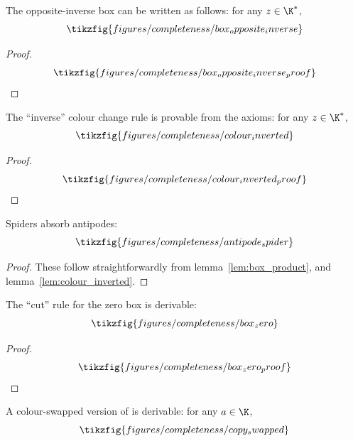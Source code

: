 \begin{lemma}
  \label{lem:box_opposite_inverse}
  The opposite-inverse box can be written as follows: for any \(z \in \K^*\),
  \begin{equation*}
    \tikzfig{figures/completeness/box_opposite_inverse}
  \end{equation*}
\end{lemma}
\begin{proof}
  \begin{equation}
    \tikzfig{figures/completeness/box_opposite_inverse_proof}
  \end{equation}
\end{proof}
\begin{lemma}
  \label{lem:colour_inverted}
  The ``inverse'' colour change rule is provable from the axioms: for any
  \(z \in \K^*\),
  \begin{equation*}
    \tikzfig{figures/completeness/colour_inverted}
  \end{equation*}
\end{lemma}
\begin{proof}
  \begin{equation}
    \tikzfig{figures/completeness/colour_inverted_proof}
  \end{equation}
\end{proof}
\begin{lemma}
  \label{lem:antipode_spider}
  Spiders absorb antipodes:
  \begin{equation*}
    \tikzfig{figures/completeness/antipode_spider}
  \end{equation*}
\end{lemma}
\begin{proof}
  These follow straightforwardly from lemma~\ref{lem:box_product}, \TextColour
  and lemma~\ref{lem:colour_inverted}.
\end{proof}
\begin{lemma}
  \label{lem:box_zero}
  The ``cut'' rule for the zero box is derivable:
  \begin{equation*}
    \tikzfig{figures/completeness/box_zero}
  \end{equation*}
\end{lemma}
\begin{proof}
  \begin{equation}
    \tikzfig{figures/completeness/box_zero_proof}
  \end{equation}
\end{proof}
\begin{lemma}
  \label{lem:copy_swapped}
  A colour-swapped version of \TextCopy is derivable: for any \(a \in \K\),
  \begin{equation*}
    \tikzfig{figures/completeness/copy_swapped}
  \end{equation*}
\end{lemma}
